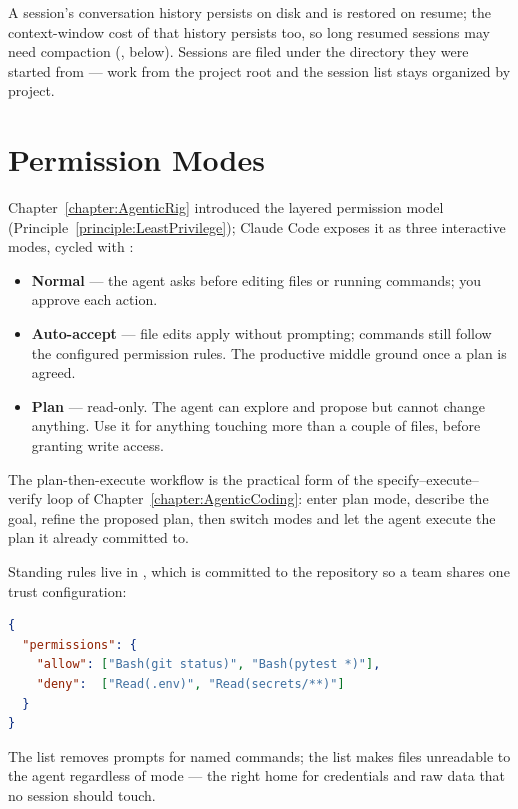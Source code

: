 A session's conversation history persists on disk and is restored on resume; the context-window cost of that history persists too, so long resumed sessions may need compaction (, below).
Sessions are filed under the directory they were started from --- work from the project root and the session list stays organized by project.

\section{Permission Modes}

Chapter~\ref{chapter:AgenticRig} introduced the layered permission model (Principle~\ref{principle:LeastPrivilege}); Claude Code exposes it as three interactive modes, cycled with :

\begin{itemize}
\item \textbf{Normal} --- the agent asks before editing files or running commands; you approve each action.
\item \textbf{Auto-accept} --- file edits apply without prompting; commands still follow the configured permission rules. The productive middle ground once a plan is agreed.
\item \textbf{Plan} --- read-only. The agent can explore and propose but cannot change anything. Use it for anything touching more than a couple of files, before granting write access.
\end{itemize}

The plan-then-execute workflow is the practical form of the specify--execute--verify loop of Chapter~\ref{chapter:AgenticCoding}: enter plan mode, describe the goal, refine the proposed plan, then switch modes and let the agent execute the plan it already committed to.

Standing rules live in , which is committed to the repository so a team shares one trust configuration:

\begin{lstlisting}[language=json]
{
  "permissions": {
    "allow": ["Bash(git status)", "Bash(pytest *)"],
    "deny":  ["Read(.env)", "Read(secrets/**)"]
  }
}
\end{lstlisting}

The  list removes prompts for named commands; the  list makes files unreadable to the agent regardless of mode --- the right home for credentials and raw data that no session should touch.


